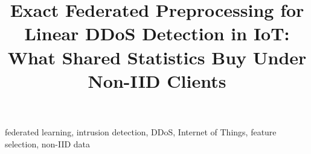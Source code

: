 \documentclass[conference]{IEEEtran}
\begin{document}
\title{Exact Federated Preprocessing for Linear DDoS Detection in IoT: What Shared Statistics Buy Under Non-IID Clients}

\author{
}

\maketitle

\begin{abstract}

\end{abstract}

\begin{IEEEkeywords}
federated learning, intrusion detection, DDoS, Internet of Things, feature selection, non-IID data
\end{IEEEkeywords}







{\scriptsize
}

{\scriptsize

}
\end{document}
